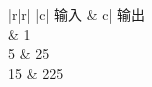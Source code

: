 \documentclass [nofonts] {ctexart}
\begin{document}
\begin {tabular} {|r|r|}
	\hline
	 {|c|} {输入}	&
	 {c|} {输出}	\\
		& 1		\\
	5	& 25	\\
	15	& 225	\\
	\hline
\end {tabular}
\end{document}
